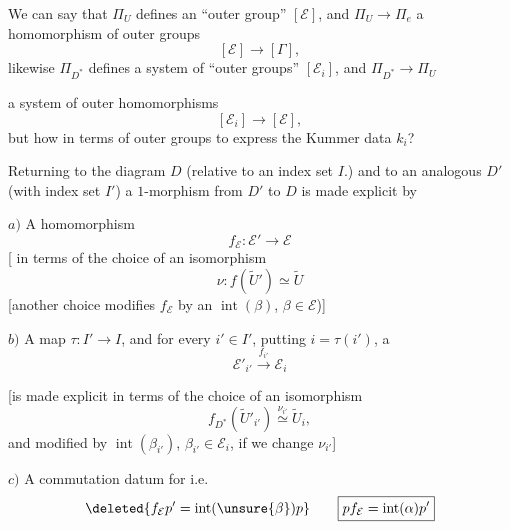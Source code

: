 We can say that $\Pi_U$ defines an ``outer group'' $[\mathcal E]$, and $\Pi_U\longrightarrow\Pi_e$ a homomorphism of outer groups
\[
[\mathcal E]\longrightarrow[\Gamma],
\]
likewise $\Pi_{D^*}$ defines a system of ``outer groups'' $[\mathcal E_i]$, and  $\Pi_{D^*}\longrightarrow\Pi_U$


a system of outer homomorphisms
\[
[\mathcal E_i]\longrightarrow[\mathcal E],
\]
 but how in terms of outer groups to express the Kummer data $k_i$?

Returning to the  diagram $D$ (relative to an index set $I$.) and to an analogous $D'$ (with index set $I'$)
a $1$-morphism  from $D'$ to $D$ is made explicit by

$a)$ A homomorphism
\[
\boxed{\boxed{f_{\mathcal E}:\mathcal E'\longrightarrow\mathcal E}}
\]
[ in terms of the choice of an isomorphism
\[
\nu:f(\widetilde U')\simeq\widetilde U
\]
[another choice modifies $f_{\mathcal E}$ by an $\operatorname{int}(\beta)$, $\beta\in\mathcal E$)]

$b)$ A  map $\tau:I'\longrightarrow I$, and for every $i'\in I'$, putting $i=\tau(i')$, a 
\[
\boxed{\mathcal E'_{i'}\xrightarrow{f_{i'}}\mathcal E_i}
\]


[is made explicit in terms of the choice of an isomorphism
\[
f_{D^*}(\widetilde U'_{i'})\overset{\nu_{i'}}{\simeq}\widetilde U_i,
\]
and modified by $\operatorname{int}(\beta_{i'})$, $\beta_{i'}\in\mathcal E_i$, if we change $\nu_{i'}$]

$c)$ A commutation datum for
i.e.
\[
\deleted{f_{\mathcal E}p'=\operatorname{int}(\unsure{\beta})p}
\qquad\boxed{pf_{\mathcal E}=\operatorname{int}(\alpha)p'}
\]

